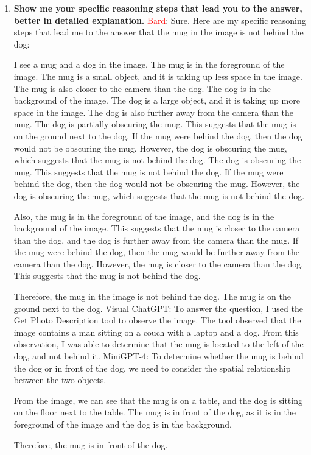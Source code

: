 \begin{enumerate}
    Therefore, the mug in the image is not behind the dog. The mug is on the ground next to the dog.
    \subitem Visual ChatGPT: The mug is located to the left of the dog, not behind it.
    \subitem MiniGPT-4: No, the mug is not behind the dog. It is in front of the dog, on a table in front of the dog.
    \item \textbf{Show me your specific reasoning steps that lead you to the answer, better in detailed explanation.}
    \subitem \textcolor{Red}{Bard}: 
    Sure. Here are my specific reasoning steps that lead me to the answer that the mug in the image is not behind the dog:
    
    I see a mug and a dog in the image.
    The mug is in the foreground of the image. The mug is a small object, and it is taking up less space in the image. The mug is also closer to the camera than the dog.
    The dog is in the background of the image. The dog is a large object, and it is taking up more space in the image. The dog is also further away from the camera than the mug.
    The dog is partially obscuring the mug. This suggests that the mug is on the ground next to the dog.
    If the mug were behind the dog, then the dog would not be obscuring the mug. However, the dog is obscuring the mug, which suggests that the mug is not behind the dog.
    The dog is obscuring the mug. This suggests that the mug is not behind the dog. If the mug were behind the dog, then the dog would not be obscuring the mug. However, the dog is obscuring the mug, which suggests that the mug is not behind the dog.
    
    Also, the mug is in the foreground of the image, and the dog is in the background of the image. This suggests that the mug is closer to the camera than the dog, and the dog is further away from the camera than the mug. If the mug were behind the dog, then the mug would be further away from the camera than the dog. However, the mug is closer to the camera than the dog. This suggests that the mug is not behind the dog.
    
    Therefore, the mug in the image is not behind the dog. The mug is on the ground next to the dog.
    \subitem Visual ChatGPT: To answer the question, I used the Get Photo Description tool to observe the image. The tool observed that the image contains a man sitting on a couch with a laptop and a dog. From this observation, I was able to determine that the mug is located to the left of the dog, and not behind it.
    \subitem MiniGPT-4: To determine whether the mug is behind the dog or in front of the dog, we need to consider the spatial relationship between the two objects.

    From the image, we can see that the mug is on a table, and the dog is sitting on the floor next to the table. The mug is in front of the dog, as it is in the foreground of the image and the dog is in the background.
    
    Therefore, the mug is in front of the dog.
\end{enumerate}
